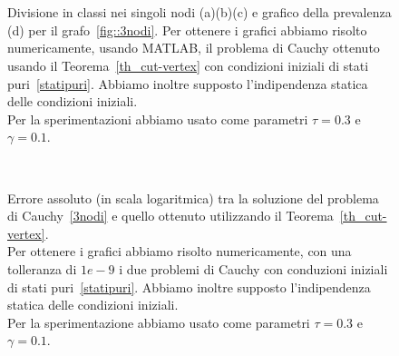\begin{figure}[!htb]
\centering
\subfloat[][Nodo 1.]
	{\resizebox{0.45\textwidth}{!}{}}
 \quad 
\subfloat[][Nodo 2.]
{\resizebox{0.45\textwidth}{!}{ }}
\\
\subfloat[][Nodo 3.]
{\resizebox{0.45\textwidth}{!}
{}
}
\quad 
\subfloat[][Prevalenza.]
{\resizebox{0.45\textwidth}{!}{ }}
\\

\caption[Sperimentazione in MATLAB relativo al grafo~\ref{fig::3nodi}]{Divisione in classi nei singoli nodi (a)(b)(c) e grafico della prevalenza (d) per il grafo~\ref{fig::3nodi}.  Per ottenere i grafici abbiamo risolto numericamente,  usando MATLAB,  il problema di Cauchy ottenuto usando il Teorema~\ref{th_cut-vertex} con condizioni iniziali  di stati puri~\eqref{statipuri}.  Abbiamo inoltre supposto l'indipendenza statica delle condizioni iniziali.\\
Per la sperimentazioni abbiamo usato come parametri $\tau= 0.3$ e $\gamma =0.1 $.}\label{fig::3nodicut}

\end{figure}
\begin{figure}[!htb]
	\centering
	\subfloat[][Nodo 1.]
	{\resizebox{0.45\textwidth}{!}{}}
 \quad 
\subfloat[][Nodo 2.]
{\resizebox{0.45\textwidth}{!}{ }}
\\
\subfloat[][Nodo 3.]
{\resizebox{0.45\textwidth}{!}
{}}
\caption[Errori assoluti relativi al grafo~\ref{fig::3nodi} tra modello esatto e cut-vertex] {Errore assoluto (in scala logaritmica) tra la soluzione del problema di Cauchy~\eqref{3nodi} e quello ottenuto utilizzando il Teorema~\ref{th_cut-vertex}.\\
Per ottenere i grafici abbiamo risolto numericamente, con una tolleranza di $1e-9$ i due problemi di Cauchy con conduzioni iniziali di stati puri~\eqref{statipuri}. Abbiamo inoltre supposto l'indipendenza statica delle condizioni iniziali.\\
Per la sperimentazione abbiamo usato come parametri $\tau = 0.3$ e $\gamma = 0.1$. }
\label{fig::errori3nodi}
\end{figure}


